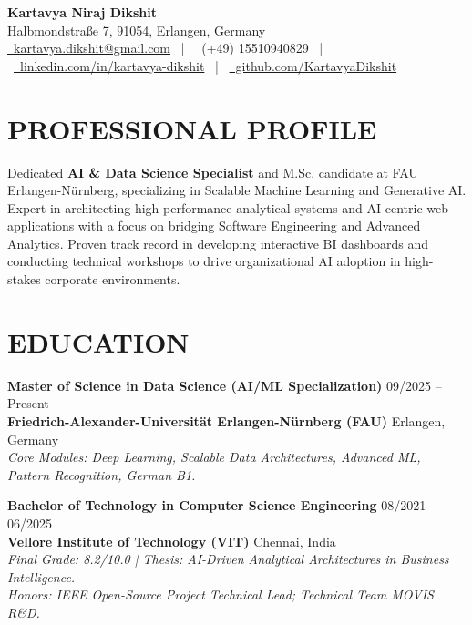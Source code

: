 \documentclass[10pt, a4paper]{article}
\begin{document}
\begin{center}
    {\LARGE \bfseries \color{primarycolor} Kartavya Niraj Dikshit} \\
    \vspace{4pt}
    \small
    Halbmondstraße 7, 91054, Erlangen, Germany \\
    \href{mailto:kartavya.dikshit@gmail.com}{\faEnvelope\ kartavya.dikshit@gmail.com} \ | \ 
    \faPhone\ (+49) 15510940829 \ | \ \href{https://www.linkedin.com/in/kartavya-dikshit}{\faLinkedin\ linkedin.com/in/kartavya-dikshit} \ | \ 
    \href{https://github.com/KartavyaDikshit}{\faGithub\ github.com/KartavyaDikshit}
\end{center}

\section{PROFESSIONAL PROFILE}
Dedicated \textbf{AI \& Data Science Specialist} and M.Sc. candidate at FAU Erlangen-Nürnberg, specializing in Scalable Machine Learning and Generative AI. Expert in architecting high-performance analytical systems and AI-centric web applications with a focus on bridging Software Engineering and Advanced Analytics. Proven track record in developing interactive BI dashboards and conducting technical workshops to drive organizational AI adoption in high-stakes corporate environments.

\section{EDUCATION}
\textbf{Master of Science in Data Science (AI/ML Specialization)} \hfill 09/2025 – Present \\
\textbf{Friedrich-Alexander-Universität Erlangen-Nürnberg (FAU)} \hfill Erlangen, Germany \\
\textit{Core Modules: Deep Learning, Scalable Data Architectures, Advanced ML, Pattern Recognition, German B1.}

\vspace{6pt}
\textbf{Bachelor of Technology in Computer Science Engineering} \hfill 08/2021 – 06/2025 \\
\textbf{Vellore Institute of Technology (VIT)} \hfill Chennai, India \\
\textit{Final Grade: 8.2/10.0 | Thesis: AI-Driven Analytical Architectures in Business Intelligence.} \\
\textit{Honors: IEEE Open-Source Project Technical Lead; Technical Team MOVIS R\&D.}
\end{document}
